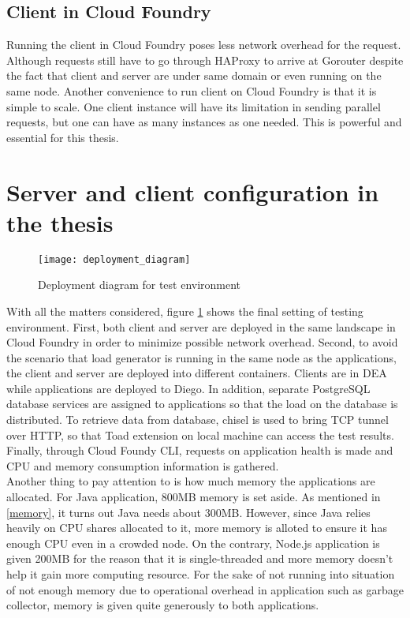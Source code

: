 \subsection{Client in Cloud Foundry}
Running the client in Cloud Foundry poses less network overhead for the request. Although requests still have to go through HAProxy to arrive at Gorouter despite the fact that client and server are under same domain or even running on the same node. Another convenience to run client on Cloud Foundry is that it is simple to scale. One client instance will have its limitation in sending parallel requests, but one can have as many instances as one needed. This is powerful and essential for this thesis. 

\section{Server and client configuration in the thesis}
\begin{figure}[h]
	\centering
	\texttt{[image: deployment\_diagram]}
	\caption{Deployment diagram for test environment}
	\label{deployment-diagram}
\end{figure}
With all the matters considered, figure \ref{deployment-diagram} shows the final setting of testing environment. First, both client and server are deployed in the same landscape in Cloud Foundry in order to minimize possible network overhead. Second, to avoid the scenario that load generator is running in the same node as the applications, the client and server are deployed into different containers. Clients are in DEA while applications are deployed to Diego. In addition, separate PostgreSQL database services are assigned to applications so that the load on the database is distributed. To retrieve data from database, chisel is used to bring TCP tunnel over HTTP, so that Toad extension on local machine can access the test results. Finally, through Cloud Foundy CLI, requests on application health is made and CPU and memory consumption information is gathered. \\
Another thing to pay attention to is how much memory the applications are allocated. For Java application, 800MB memory is set aside. As mentioned in \ref{memory}, it turns out Java needs about 300MB. However, since Java relies heavily on CPU shares allocated to it, more memory is alloted to ensure it has enough CPU even in a crowded node. On the contrary, Node.js application is given 200MB for the reason that it is single-threaded and more memory doesn't help it gain more computing resource. For the sake of not running into situation of not enough memory due to operational overhead in application such as garbage collector, memory is given quite generously to both applications.  



